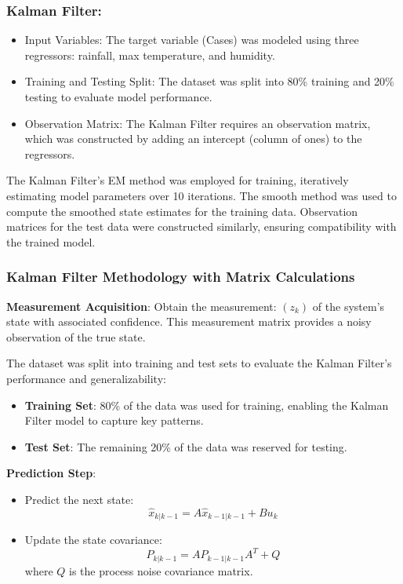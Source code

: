 \subsubsection{Kalman Filter:}
\begin{itemize}
	\item Input Variables: The target variable (Cases) was modeled using three regressors: rainfall, max temperature, and humidity.
	\item Training and Testing Split: The dataset was split into 80\% training and 20\% testing to evaluate model performance.
	\item Observation Matrix: The Kalman Filter requires an observation matrix, which was constructed by adding an intercept (column of ones) to the regressors.
\end{itemize}

The Kalman Filter's EM method was employed for training, iteratively estimating model parameters over 10 iterations. The smooth method was used to compute the smoothed state estimates for the training data. Observation matrices for the test data were constructed similarly, ensuring compatibility with the trained model.



\subsubsection{Kalman Filter Methodology with Matrix Calculations}

\textbf{Measurement Acquisition}: Obtain the measurement:
$(z_k)$ of the system's state with associated confidence. This measurement matrix provides a noisy observation of the true state.

The dataset was split into training and test sets to evaluate the Kalman Filter's performance and generalizability:
\begin{itemize}
	\item \textbf{Training Set}: 80\% of the data was used for training, enabling the Kalman Filter model to capture key patterns.
	\item \textbf{Test Set}: The remaining 20\% of the data was reserved for testing.
\end{itemize}

\textbf{Prediction Step}:
\begin{itemize}
	\item Predict the next state:
	\[
	\hat{x}_{k|k-1} = A \hat{x}_{k-1|k-1} + B u_k
	\]
	
	\item Update the state covariance:
	\[
	P_{k|k-1} = A P_{k-1|k-1} A^T + Q
	\]
	where \( Q \) is the process noise covariance matrix.
\end{itemize}

